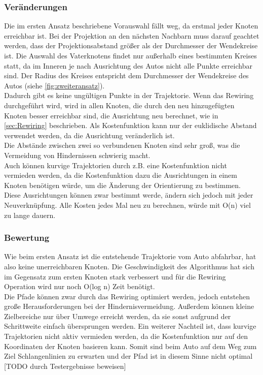 \subsubsection{Veränderungen}
Die im ersten Ansatz beschriebene Vorauswahl fällt weg, da erstmal jeder Knoten erreichbar ist. Bei der Projektion an den nächsten Nachbarn muss darauf geachtet werden, dass der Projektionsabstand größer als der Durchmesser der Wendekreise ist. Die Auswahl des Vaterknotens findet nur außerhalb eines bestimmten Kreises statt, da im Inneren je nach Ausrichtung des Autos nicht alle Punkte erreichbar sind. Der Radius des Kreises entspricht dem Durchmesser der Wendekreise des Autos (siehe \ref{fig:zweiteransatz}).\\
Dadurch gibt es keine ungültigen Punkte in der Trajektorie. Wenn das Rewiring durchgeführt wird, wird in allen Knoten, die durch den neu hinzugefügten Knoten besser erreichbar sind, die Ausrichtung neu berechnet, wie in \ref{sec:Rewiring} beschrieben. Als Kostenfunktion kann nur der euklidische Abstand verwendet werden, da die Ausrichtung veränderlich ist. \\
Die Abstände zwischen zwei so verbundenen Knoten sind sehr groß, was die Vermeidung von Hindernissen schwierig macht.\\
Auch können kurvige Trajektorien durch z.B. eine Kostenfunktion nicht vermieden werden, da die Kostenfunktion dazu die Ausrichtungen in einem Knoten benötigen würde, um die Änderung der Orientierung zu bestimmen. Diese Ausrichtungen können zwar bestimmt werde, ändern sich jedoch mit jeder Neuverknüpfung. Alle Kosten jedes Mal neu zu berechnen, würde mit O(n) viel zu lange dauern.\\
\subsubsection{Bewertung}
Wie beim ersten Ansatz ist die entstehende Trajektorie vom Auto abfahrbar, hat also keine unerreichbaren Knoten. Die Geschwindigkeit des Algorithmus hat sich im Gegensatz zum ersten Knoten stark verbessert und für die Rewiring Operation wird nur noch O(log n) Zeit benötigt. \\
Die Pfade können zwar durch das Rewiring optimiert werden, jedoch entstehen große Herausforderungen bei der Hindernisvermeidung. Außerdem können kleine Zielbereiche nur über Umwege erreicht werden, da sie sonst aufgrund der Schrittweite einfach übersprungen werden. Ein weiterer Nachteil ist, dass kurvige Trajektorien nicht aktiv vermieden werden, da die Kostenfunktion nur auf den Koordinaten der Knoten basieren kann. Somit sind beim Auto auf dem Weg zum Ziel Schlangenlinien zu erwarten und der Pfad ist in diesem Sinne nicht optimal [TODO durch Testergebnisse beweisen] 

